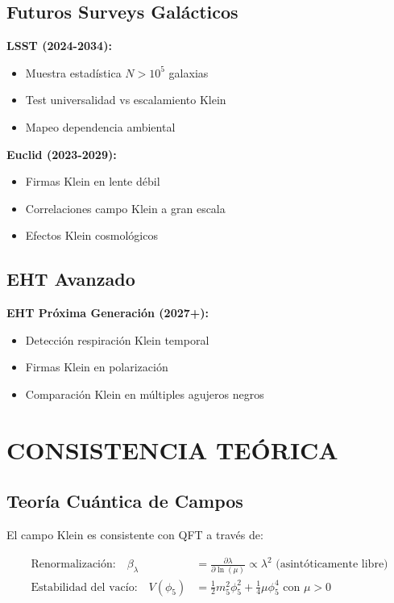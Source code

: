 \documentclass[12pt,a4paper]{article}
\begin{document}
\subsection{Futuros Surveys Galácticos}

\textbf{LSST (2024-2034):}
\begin{itemize}
\item Muestra estadística $N > 10^5$ galaxias
\item Test universalidad vs escalamiento Klein
\item Mapeo dependencia ambiental
\end{itemize}

\textbf{Euclid (2023-2029):}
\begin{itemize}
\item Firmas Klein en lente débil
\item Correlaciones campo Klein a gran escala
\item Efectos Klein cosmológicos
\end{itemize}

\subsection{EHT Avanzado}

\textbf{EHT Próxima Generación (2027+):}
\begin{itemize}
\item Detección respiración Klein temporal
\item Firmas Klein en polarización
\item Comparación Klein en múltiples agujeros negros
\end{itemize}

\section{CONSISTENCIA TEÓRICA}

\subsection{Teoría Cuántica de Campos}

El campo Klein es consistente con QFT a través de:

\begin{align}
\text{Renormalización:} \quad \beta_\lambda &= \frac{\partial\lambda}{\partial\ln(\mu)} \propto \lambda^2 \text{ (asintóticamente libre)}\\
\text{Estabilidad del vacío:} \quad V(\phi_5) &= \frac{1}{2}m_5^2\phi_5^2 + \frac{1}{4}\mu\phi_5^4 \text{ con } \mu > 0
\end{align}
\end{document}
